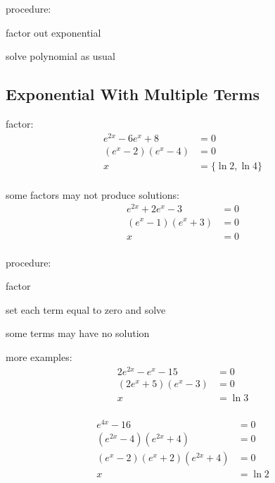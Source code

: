 \documentclass{exam}
\begin{document}
  procedure:
  \begin{itemize*}
    \item factor out exponential
    \item solve polynomial as usual
  \end{itemize*}

  \subsection{Exponential With Multiple Terms}
  factor:
  \begin{align*}
    e^{2x} - 6e^x + 8  &= 0 \\
    (e^x - 2)(e^x - 4) &= 0 \\
    x                  &= \{ \ln 2, \ln 4 \} \\
  \end{align*}

  some factors may not produce solutions:
  \begin{align*}
    e^{2x} + 2e^x - 3  &= 0 \\
    (e^x - 1)(e^x + 3) &= 0 \\
    x                  &= 0 \\
  \end{align*}

  procedure:
  \begin{itemize*}
    \item factor 
    \item set each term equal to zero and solve
    \item some terms may have no solution
  \end{itemize*}

  more examples:
  \begin{align*}
    2e^{2x} - e^x - 15  &= 0 \\
    (2e^x + 5)(e^x - 3) &= 0 \\
    x                   &= \ln 3 \\
  \end{align*}

  \begin{align*}
    e^{4x} - 16                    &= 0 \\
    (e^{2x} - 4)(e^{2x} + 4)       &= 0 \\
    (e^x - 2)(e^x + 2)(e^{2x} + 4) &= 0 \\
    x                              &= \ln 2 \\
  \end{align*}
\end{document}

